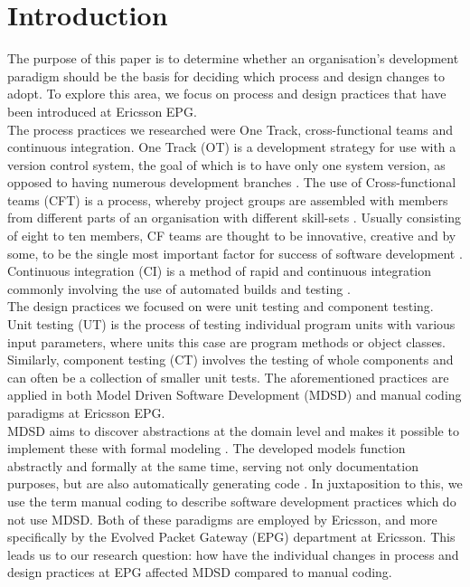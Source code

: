 \documentclass[fina_report_innit.tex]{subfiles}
\begin{document}
\section{Introduction}

The purpose of this paper is to determine whether an organisation's development paradigm should be the basis for deciding which process and design changes to adopt. To explore this area, we focus on process and design practices that have been introduced at Ericsson EPG.
\\

The process practices we researched were One Track, cross-functional teams and continuous integration. One Track (OT) is a development strategy for use with a version control system, the goal of which is to have only one system version, as opposed to having numerous development branches \cite{hribar2008first}. The use of Cross-functional teams (CFT) is a process, whereby project groups are assembled with members from different parts of an organisation with different skill-sets \cite{henke1993perspective}\cite{ghobadi2011challenges}. Usually consisting of eight to ten members, CF teams are thought to be innovative, creative \cite{ghobadi2011challenges} and by some, to be the single most important factor for success of software development \cite{marchwinski2000technical}. Continuous integration (CI) is a method of rapid and continuous integration commonly involving the use of automated builds and testing \cite{sommerville10software}.  
\\

The design practices we focused on were unit testing and component testing. Unit testing (UT) is the process of testing individual program units with various input parameters, where units this case are program methods or object classes. Similarly, component testing (CT) involves the testing of whole components and can often be a collection of smaller unit tests. The aforementioned practices are applied in both Model Driven Software Development (MDSD) and manual coding paradigms at Ericsson EPG.
\\

MDSD aims to discover abstractions at the domain level and makes it possible to implement these with formal modeling \cite{stahl2006model}. The developed models function abstractly and formally at the same time, serving not only documentation purposes, but are also automatically generating code \cite{stahl2006model}. In juxtaposition to this, we use the term manual coding to describe software development practices which do not use MDSD. Both of these paradigms are employed by Ericsson, and more specifically by the Evolved Packet Gateway (EPG) department at Ericsson. This leads us to our research question: how have the individual changes in process and design practices at EPG affected MDSD compared to manual coding.
\\
\end{document}
